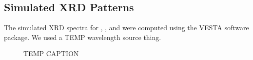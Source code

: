\subsection{Simulated XRD Patterns}  %
%
%
The simulated XRD spectra for \aIrOthree, \bIrOthree, and \rIrOtwo were computed using the VESTA software package.
We used a TEMP wavelength source thing.


\begin{figure}[!htb]
\centering
{}
\caption{\label{fig:xrd_patterns}
TEMP CAPTION
}
\end{figure}


